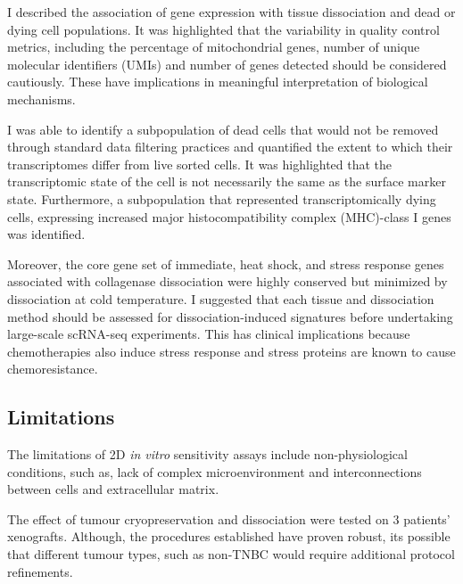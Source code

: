 I described the association of gene expression with tissue dissociation and dead or dying cell populations. It was highlighted that the variability in quality control metrics, including the percentage of mitochondrial genes, number of unique molecular identifiers (UMIs) and number of genes detected should be considered cautiously. These have implications in meaningful interpretation of biological mechanisms.

I was able to identify a subpopulation of dead cells that would not be removed through standard data filtering practices and quantified the extent to which their transcriptomes differ from live sorted cells. It was highlighted that the transcriptomic state of the cell is not necessarily the same as the surface marker state. Furthermore, a subpopulation that represented transcriptomically dying cells, expressing increased major histocompatibility complex (MHC)-class I genes was identified. 
 
  Moreover, the core gene set of immediate, heat shock, and stress response genes associated with collagenase dissociation were highly conserved but minimized by dissociation at cold temperature. I suggested that each tissue and dissociation method should be assessed for dissociation-induced signatures before undertaking large-scale scRNA-seq experiments. This has clinical implications because chemotherapies also induce stress response and stress proteins are known to cause chemoresistance.



\subsection{Limitations}

 The limitations of 2D \textit{in vitro} sensitivity assays include non-physiological conditions, such as, lack of complex microenvironment and interconnections between cells and extracellular matrix. 

 The effect of tumour cryopreservation and dissociation were tested on 3 patients' xenografts. Although, the procedures established have proven robust, its possible that different tumour types, such as non-TNBC would require additional protocol refinements.



